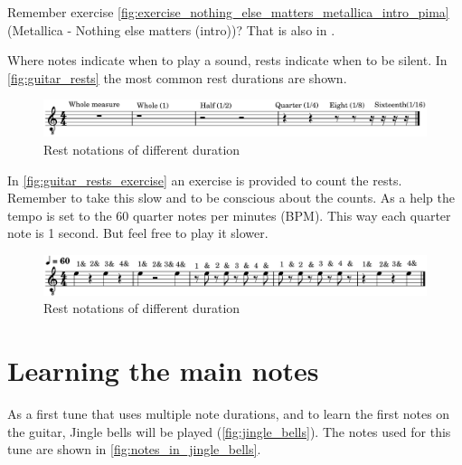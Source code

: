Remember exercise \autoref{fig:exercise_nothing_else_matters_metallica_intro_pima} (Metallica - Nothing else matters (intro))? That is also in .

\newpage

Where notes indicate when to play a sound, rests indicate when to be silent. In \autoref{fig:guitar_rests} the most common rest durations are shown.

\begin{figure}[h]
	\centering
	\includegraphics[width=\textwidth]{../../MuseScore/Guitar/GuitarRests.png}
	\caption{Rest notations of different duration}
	\label{fig:guitar_rests}
\end{figure}

In \autoref{fig:guitar_rests_exercise} an exercise is provided to count the rests. Remember to take this slow and to be conscious about the counts. As a help the tempo is set to the 60 quarter notes per minutes (BPM). This way each quarter note is 1 second. But feel free to play it slower.

\begin{figure}[h]
	\centering
	\includegraphics[width=\textwidth]{../../MuseScore/Guitar/GuitarRestsExercise.png}
	\caption{Rest notations of different duration}
	\label{fig:guitar_rests_exercise}
\end{figure}


\newpage

\section{Learning the main notes} \label{sec:learning_main_notes}

As a first tune that uses multiple note durations, and to learn the first notes on the guitar, Jingle bells will be played (\autoref{fig:jingle_bells}). The notes used for this tune are shown in \autoref{fig:notes_in_jingle_bells}.


